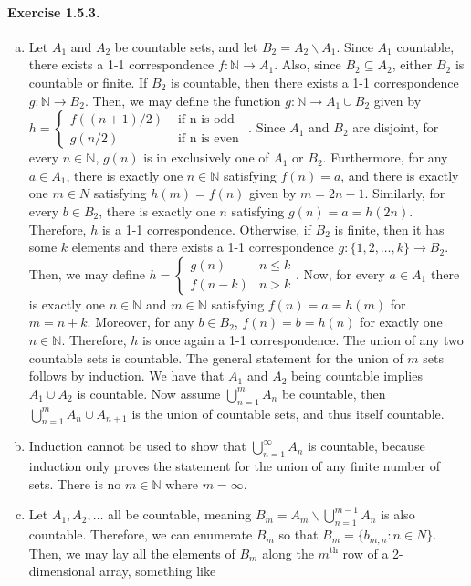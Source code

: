 \documentclass{article}
\newcommand{\N}{\mathbb{N}}
\begin{document}
\paragraph{Exercise 1.5.3.}
\begin{enumerate}[(a)]
    \item Let $A_1$ and $A_2$ be countable sets, and let $B_2 = A_2 \backslash A_1$. Since $A_1$ countable, there exists a 1-1 correspondence $f: \N \to A_1$. Also, since $B_2 \subseteq A_2$, either $B_2$ is countable or finite. If $B_2$ is countable, then there exists a 1-1 correspondence $g: \N \to B_2$. Then, we may define the function $g:\N \to A_1 \cup B_2$ given by $h = \begin{cases}f((n+1)/2) & \text{ if n is odd }\\ g(n/2) & \text{ if n is even }\end{cases}$. Since $A_1$ and $B_2$ are disjoint, for every $n\in \N$, $g(n)$ is in exclusively one of $A_1$ or $B_2$. Furthermore, for any $a\in A_1$, there is exactly one $n\in \N$ satisfying $f(n) = a$, and there is exactly one $m\in N$ satisfying $h(m) = f(n)$ given by $m=2n-1$. Similarly, for every $b\in B_2$, there is exactly one $n$ satisfying $g(n)=a=h(2n)$. Therefore, $h$ is a 1-1 correspondence. Otherwise, if $B_2$ is finite, then it has some $k$ elements and there exists a 1-1 correspondence $g:\{1,2,\ldots,k\} \to B_2$. Then, we may define $h = \begin{cases} g(n)& n \leq k \\ f(n-k) &n > k\end{cases}$. Now, for every $a\in A_1$ there is exactly one $n\in \N$ and $m\in\N$ satisfying $f(n)=a=h(m)$ for $m=n+k$. Moreover, for any $b \in B_2$, $f(n)=b=h(n)$ for exactly one $n\in \N$. Therefore, $h$ is once again a 1-1 correspondence. The union of any two countable sets is countable. The general statement for the union of $m$ sets follows by induction. We have that $A_1$ and $A_2$ being countable implies $A_1 \cup A_2$ is countable. Now assume $\bigcup_{n=1}^m A_n$ be countable, then $\bigcup_{n=1}^m A_n \cup A_{n+1}$ is the union of countable sets, and thus itself countable. 
    
    \item Induction cannot be used to show that $\bigcup_{n=1}^\infty A_n$ is countable, because induction only proves the statement for the union of any finite number of sets. There is no $m\in \N$ where $m = \infty$.

    \item Let $A_1, A_2, \dots$ all be countable, meaning $B_m = A_m \backslash \bigcup_{n=1}^{m-1} A_n$ is also countable. Therefore, we can enumerate $B_m$ so that $B_m = \{ b_{m,n} : n\in N \}$. Then, we may lay all the elements of $B_m$ along the $m^\text{th}$ row of a 2-dimensional array, something like


\end{enumerate}
\end{document}
